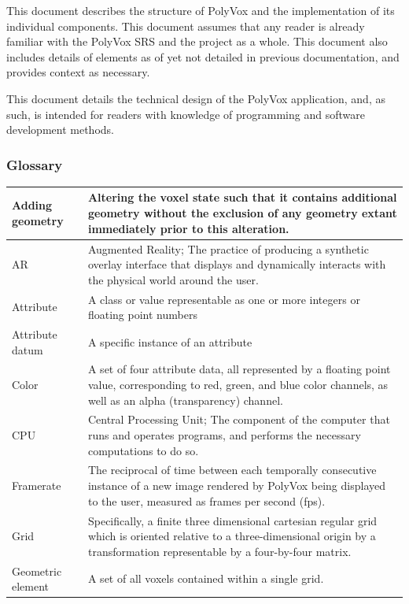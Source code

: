 \documentclass[onecolumn, draftclsnofoot,10pt, compsoc]{IEEEtran}
\newcounter{threesection}[subsubsection]
\begin{document}
This document describes the structure of PolyVox and the implementation of its individual components.
This document assumes that any reader is already familiar with the PolyVox SRS and the project as a whole.
This document also includes details of elements as of yet not detailed in previous documentation, and provides context as necessary.

This document details the technical design of the PolyVox application, and, as such, is intended for readers with knowledge of programming and software development methods. 

\subsubsection{Glossary}
\begin{longtable}{ | l | p{12cm} | }
 \hline			
Adding geometry & Altering the voxel state such that it contains additional geometry without the exclusion of any geometry extant immediately prior to this alteration.  \\ \hline 
AR & Augmented Reality; The practice of producing a synthetic overlay interface that displays and dynamically interacts with the physical world around the user. \\ \hline 
Attribute & A class or value representable as one or more integers or floating point numbers  \\ \hline
Attribute datum & A specific instance of an attribute  \\ \hline
Color & A set of four attribute data, all represented by a floating point value, corresponding to red, green, and blue color channels, as well as an alpha (transparency) channel.  \\ \hline
CPU & Central Processing Unit; The component of the computer that runs and operates programs, and performs the necessary computations to do so.  \\ \hline
Framerate & The reciprocal of time between each temporally consecutive instance of a new image rendered by PolyVox being displayed to the user, measured as frames per second (fps). \\ \hline 
Grid &  Specifically, a finite three dimensional cartesian regular grid which is oriented relative to a three-dimensional origin by a transformation representable by a four-by-four matrix. \\ \hline
Geometric element & A set of all voxels contained within a single grid.  \\ \hline

\end{longtable}
\end{document}
